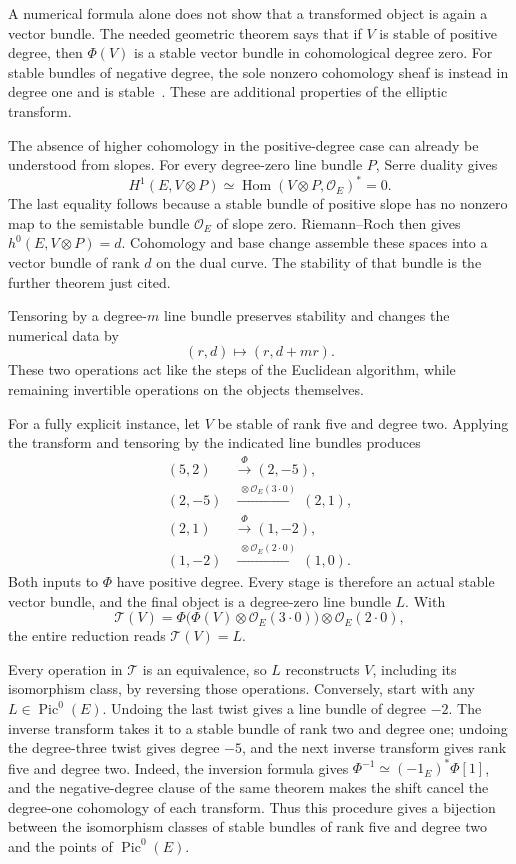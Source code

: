 \documentclass[11pt]{article}
\theoremstyle{remark}
\begin{document}
A numerical formula alone does not show that a transformed object is again a vector bundle. The needed geometric theorem says that if \(V\) is stable of positive degree, then \(\Phi(V)\) is a stable vector bundle in cohomological degree zero. For stable bundles of negative degree, the sole nonzero cohomology sheaf is instead in degree one and is stable~\cite{ruiperez-tejero}. These are additional properties of the elliptic transform.

The absence of higher cohomology in the positive-degree case can already be understood from slopes. For every degree-zero line bundle \(P\), Serre duality gives
\[
H^1(E,V\otimes P)\simeq
\operatorname{Hom}(V\otimes P,\mathcal O_E)^*=0.
\]
The last equality follows because a stable bundle of positive slope has no nonzero map to the semistable bundle \(\mathcal O_E\) of slope zero. Riemann--Roch then gives \(h^0(E,V\otimes P)=d\). Cohomology and base change assemble these spaces into a vector bundle of rank \(d\) on the dual curve. The stability of that bundle is the further theorem just cited.

Tensoring by a degree-\(m\) line bundle preserves stability and changes the numerical data by
\[
(r,d)\longmapsto(r,d+mr).
\]
These two operations act like the steps of the Euclidean algorithm, while remaining invertible operations on the objects themselves.

For a fully explicit instance, let \(V\) be stable of rank five and degree two. Applying the transform and tensoring by the indicated line bundles produces
\begin{align*}
(5,2)&\xrightarrow{\ \Phi\ }(2,-5),\\
(2,-5)&\xrightarrow{\ \otimes\mathcal O_E(3\cdot0)\ }(2,1),\\
(2,1)&\xrightarrow{\ \Phi\ }(1,-2),\\
(1,-2)&\xrightarrow{\ \otimes\mathcal O_E(2\cdot0)\ }(1,0).
\end{align*}
Both inputs to \(\Phi\) have positive degree. Every stage is therefore an actual stable vector bundle, and the final object is a degree-zero line bundle \(L\). With
\[
\mathcal T(V)
=\Phi\bigl(\Phi(V)\otimes\mathcal O_E(3\cdot0)\bigr)
\otimes\mathcal O_E(2\cdot0),
\]
the entire reduction reads \(\mathcal T(V)=L\).

Every operation in \(\mathcal T\) is an equivalence, so \(L\) reconstructs \(V\), including its isomorphism class, by reversing those operations. Conversely, start with any \(L\in\operatorname{Pic}^0(E)\). Undoing the last twist gives a line bundle of degree \(-2\). The inverse transform takes it to a stable bundle of rank two and degree one; undoing the degree-three twist gives degree \(-5\), and the next inverse transform gives rank five and degree two. Indeed, the inversion formula gives \(\Phi^{-1}\simeq(-1_E)^*\Phi[1]\), and the negative-degree clause of the same theorem makes the shift cancel the degree-one cohomology of each transform. Thus this procedure gives a bijection between the isomorphism classes of stable bundles of rank five and degree two and the points of \(\operatorname{Pic}^0(E)\).
\end{document}
